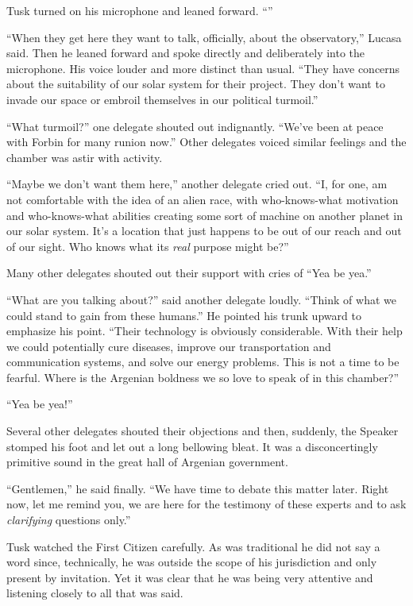 Tusk turned on his microphone and leaned forward. ``''

``When they get here they want to talk, officially, about the observatory,'' Lucasa said. Then
he leaned forward and spoke directly and deliberately into the microphone. His voice louder and
more distinct than usual. ``They have concerns about the suitability of our solar system for
their project. They don't want to invade our space or embroil themselves in our political
turmoil.''

``What turmoil?'' one delegate shouted out indignantly. ``We've been at peace with Forbin for
many runion now.'' Other delegates voiced similar feelings and the chamber was astir with
activity.

``Maybe we don't want them here,'' another delegate cried out. ``I, for one, am not comfortable
with the idea of an alien race, with who-knows-what motivation and who-knows-what abilities
creating some sort of machine on another planet in our solar system. It's a location that just
happens to be out of our reach and out of our sight. Who knows what its \emph{real} purpose
might be?''

Many other delegates shouted out their support with cries of ``Yea be yea.''

``What are you talking about?'' said another delegate loudly. ``Think of what we could stand to
gain from these humans.'' He pointed his trunk upward to emphasize his point. ``Their technology
is obviously considerable. With their help we could potentially cure diseases, improve our
transportation and communication systems, and solve our energy problems. This is not a time to
be fearful. Where is the Argenian boldness we so love to speak of in this chamber?''

``Yea be yea!''

Several other delegates shouted their objections and then, suddenly, the Speaker stomped his
foot and let out a long bellowing bleat. It was a disconcertingly primitive sound in the great
hall of Argenian government.

``Gentlemen,'' he said finally. ``We have time to debate this matter later. Right now, let me
remind you, we are here for the testimony of these experts and to ask \emph{clarifying}
questions only.''

Tusk watched the First Citizen carefully. As was traditional he did not say a word since,
technically, he was outside the scope of his jurisdiction and only present by invitation. Yet it
was clear that he was being very attentive and listening closely to all that was said.

